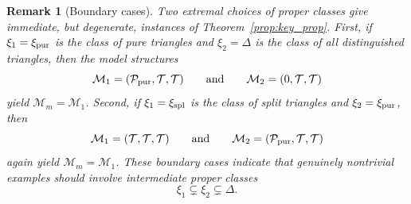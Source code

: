 \documentclass[11pt,a4paper]{amsart}
\numberwithin{equation}{section}
\theoremstyle{plain}
\newtheorem{remark}[thm]{Remark}
\begin{document}

\begin{remark}[Boundary cases]
\label{rem:boundary-proper-classes}
Two extremal choices of proper classes give immediate, but degenerate,
instances of Theorem~\ref{prop:key_prop}. First, if
$\xi_1=\xi_{\rm pur}$ is the class of pure triangles and
$\xi_2=\Delta$ is the class of all distinguished triangles, then the
model structures
\[
\mathcal M_1=(\mathcal P_{\rm pur},\mathcal T,\mathcal T)
\qquad\text{and}\qquad
\mathcal M_2=(0,\mathcal T,\mathcal T)
\]
yield $\mathcal M_m=\mathcal M_1$. Second, if
$\xi_1=\xi_{\rm spl}$ is the class of split triangles and
$\xi_2=\xi_{\rm pur}$, then
\[
\mathcal M_1=(\mathcal T,\mathcal T,\mathcal T)
\qquad\text{and}\qquad
\mathcal M_2=(\mathcal P_{\rm pur},\mathcal T,\mathcal T)
\]
again yield $\mathcal M_m=\mathcal M_1$. These boundary cases indicate
that genuinely nontrivial examples should involve intermediate proper
classes
\[
\xi_1\subsetneq\xi_2\subsetneq\Delta.
\]
\end{remark}
\end{document}
